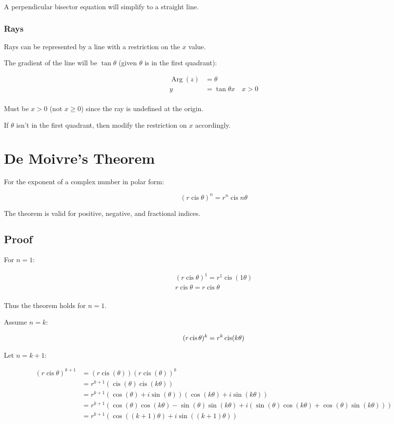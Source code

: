 \documentclass[a4paper,11pt]{article}
\DeclareMathOperator\cis{cis}
\DeclareMathOperator\Arg{Arg}
\begin{document}
A perpendicular bisector equation will simplify to a straight line.


\subsubsection{Rays}

Rays can be represented by a line with a restriction on the $x$ value.

The gradient of the line will be $\tan{\theta}$ (given $\theta$ is in the first
quadrant):

$$
\begin{aligned}
\Arg(z) & = \theta \\
y & = \tan{\theta} x \quad x > 0 \\
\end{aligned}
$$

Must be $x > 0$ (not $x \geq 0$) since the ray is undefined at the origin.

If $\theta$ isn't in the first quadrant, then modify the restriction on $x$
accordingly.




\section{De Moivre's Theorem}

For the exponent of a complex number in polar form:

$$
(r \cis{\theta})^n = r^n \cis{n \theta}
$$

The theorem is valid for positive, negative, and fractional indices.


\subsection{Proof}

For $n = 1$:

$$
\begin{aligned}
(r \cis{\theta})^1 = r^1 \cis(1 \theta) \\
r \cis{\theta} = r \cis{\theta} \\
\end{aligned}
$$

Thus the theorem holds for $n = 1$.

Assume $n = k$:

$$
(r \cis{\theta})^k = r^k \cis(k \theta) \\
$$

Let $n = k + 1$:

$$
\begin{aligned}
(r \cis{\theta})^{k + 1} & = (r \cis(\theta))(r \cis(\theta))^k \\
& = r^{k + 1} (\cis(\theta) \cis(k \theta)) \\
& = r^{k + 1} (\cos(\theta) + i \sin(\theta))(\cos(k \theta) + i \sin(k \theta)) \\
& = r^{k + 1} (\cos(\theta) \cos(k \theta) - \sin(\theta) \sin(k \theta) + i(\sin(\theta) \cos(k \theta) + \cos(\theta) \sin(k \theta))) \\
& = r^{k + 1} (\cos((k + 1) \theta) + i \sin((k + 1) \theta)) \\
\end{aligned}
$$
\end{document}
